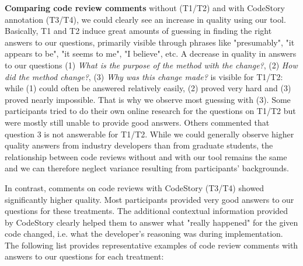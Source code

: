 \documentclass[../manifest.tex]{subfiles}
\begin{document}
\textbf{Comparing code review comments} without (T1/T2) and with CodeStory annotation (T3/T4), we could clearly see an increase in quality using our tool. Basically, T1 and T2 induce great amounts of guessing in finding the right answers to our questions, primarily visible through phrases like "presumably", "it appears to be", "it seems to me", "I believe", etc. A decrease in quality in answers to our questions (1) \textit{What is the purpose of the method with the change?}, (2) \textit{How did the method change?}, (3) \textit{Why was this change made?} is visible for T1/T2: while (1) could often be answered relatively easily, (2) proved very hard and (3) proved nearly impossible. That is why we observe most guessing with (3). Some participants tried to do their own online research for the questions on T1/T2 but were mostly still unable to provide good answers. Others commented that question 3 is not answerable for T1/T2. While we could generally observe higher quality answers from industry developers than from graduate students, the relationship between code reviews without and with our tool remains the same and we can therefore neglect variance resulting from participants' backgrounds.

In contrast, comments on code reviews with CodeStory (T3/T4) showed significantly higher quality. Most participants provided very good answers to our questions for these treatments. The additional contextual information provided by CodeStory clearly helped them to answer what "really happened" for the given code changed, i.e. what the developer's reasoning was during implementation. The following list provides representative examples of code review comments with answers to our questions for each treatment:
\end{document}
